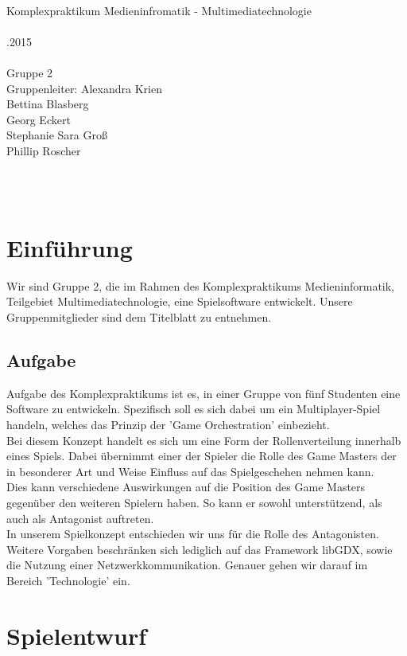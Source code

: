 \documentclass[10pt,a4paper,notitlepage]{report}
\author{Group2}
\begin{document}
\\
		{\large Komplexpraktikum Medieninfromatik - Multimediatechnologie\\}
\
\\
.2015\\\
\\
\centering 	Gruppe 2\\
		Gruppenleiter: Alexandra Krien\\
		Bettina Blasberg\\
		Georg Eckert\\
		Stephanie Sara Groß\\
		Phillip Roscher\\\

\tableofcontents
\clearpage\
\\
\begin{flushleft}
\chapter{Einführung}
Wir sind Gruppe 2, die im Rahmen des Komplexpraktikums Medieninformatik, Teilgebiet Multimediatechnologie, eine Spielsoftware entwickelt. 
Unsere Gruppenmitglieder sind dem Titelblatt zu entnehmen.
\section{Aufgabe}
Aufgabe des Komplexpraktikums ist es, in einer Gruppe von fünf Studenten eine Software zu entwickeln.
Spezifisch soll es sich dabei um ein Multiplayer-Spiel handeln, welches das Prinzip der 'Game Orchestration' einbezieht.\\
Bei diesem Konzept handelt es sich um eine Form der Rollenverteilung innerhalb eines Spiels.
Dabei übernimmt einer der Spieler die Rolle des Game Masters der in besonderer Art und Weise Einfluss auf das Spielgeschehen nehmen kann.\\
Dies kann verschiedene Auswirkungen auf die Position des Game Masters gegenüber den weiteren Spielern haben. So kann er sowohl
unterstützend, als auch als Antagonist auftreten.\\
In unserem Spielkonzept entschieden wir uns für die Rolle des Antagonisten.\\
Weitere Vorgaben beschränken sich lediglich auf das Framework libGDX, sowie die Nutzung einer Netzwerkkommunikation. Genauer gehen wir darauf im Bereich 'Technologie' ein.

\chapter{Spielentwurf}

\end{flushleft}
\end{document}
